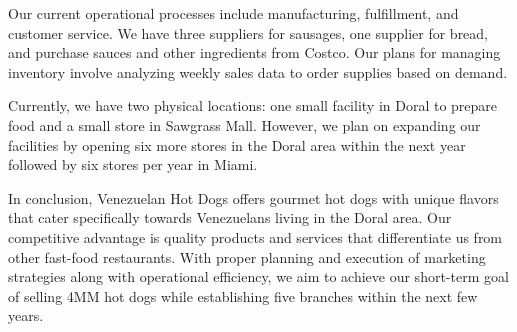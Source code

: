 Our current operational processes include manufacturing, fulfillment, and customer service. We have three suppliers for sausages, one supplier for bread, and purchase sauces and other ingredients from Costco. Our plans for managing inventory involve analyzing weekly sales data to order supplies based on demand.

Currently, we have two physical locations: one small facility in Doral to prepare food and a small store in Sawgrass Mall. However, we plan on expanding our facilities by opening six more stores in the Doral area within the next year followed by six stores per year in Miami.

In conclusion, Venezuelan Hot Dogs offers gourmet hot dogs with unique flavors that cater specifically towards Venezuelans living in the Doral area. Our competitive advantage is quality products and services that differentiate us from other fast-food restaurants. With proper planning and execution of marketing strategies along with operational efficiency, we aim to achieve our short-term goal of selling 4MM hot dogs while establishing five branches within the next few years.
